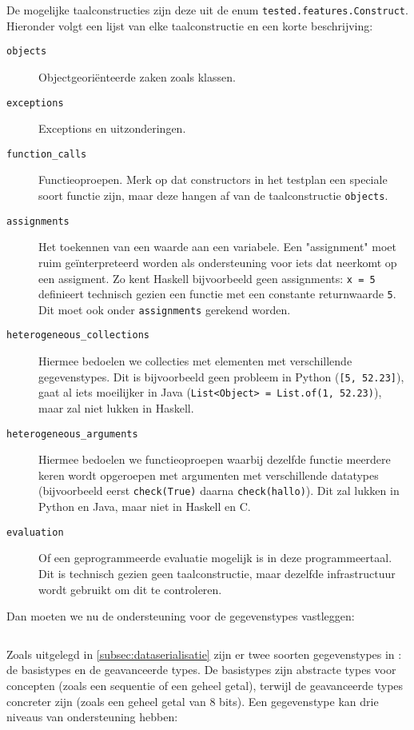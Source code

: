 De mogelijke taalconstructies zijn deze uit de enum \texttt{tested.features.Construct}.
Hieronder volgt een lijst van elke taalconstructie en een korte beschrijving:

\begin{description}
    \item[\texttt{objects}] Objectgeoriënteerde zaken zoals klassen.
    \item[\texttt{exceptions}] Exceptions en uitzonderingen.
    \item[\texttt{function\_calls}] Functieoproepen.
    Merk op dat constructors in het testplan een speciale soort functie zijn, maar deze hangen af van de taalconstructie \texttt{objects}.
    \item[\texttt{assignments}] Het toekennen van een waarde aan een variabele.
    Een "assignment" moet ruim geïnterpreteerd worden als ondersteuning voor iets dat neerkomt op een assigment.
    Zo kent Haskell bijvoorbeeld geen assignments: \texttt{x = 5} definieert technisch gezien een functie met een constante returnwaarde \texttt{5}.
    Dit moet ook onder \texttt{assignments} gerekend worden.
    \item[\texttt{heterogeneous\_collections}] Hiermee bedoelen we collecties met elementen met verschillende gegevenstypes.
    Dit is bijvoorbeeld geen probleem in Python (\texttt{[5, 52.23]}), gaat al iets moeilijker in Java (\texttt{List<Object> = List.of(1, 52.23)}), maar zal niet lukken in Haskell.
    \item[\texttt{heterogeneous\_arguments}] Hiermee bedoelen we functieoproepen waarbij dezelfde functie meerdere keren wordt opgeroepen met argumenten met verschillende datatypes (bijvoorbeeld eerst \texttt{check(True)} daarna \texttt{check(\textquotesingle{}hallo\textquotesingle{})}).
    Dit zal lukken in Python en Java, maar niet in Haskell en C\@.
    \item[\texttt{evaluation}] Of een geprogrammeerde evaluatie mogelijk is in deze programmeertaal.
    Dit is technisch gezien geen taalconstructie, maar dezelfde infrastructuur wordt gebruikt om dit te controleren.
\end{description}

Dan moeten we nu de ondersteuning voor de gegevenstypes vastleggen:

\inputminted[firstline=28,lastline=54,gobble=2]{js}{sources/c-config.json}

Zoals uitgelegd in \cref{subsec:dataserialisatie} zijn er twee soorten gegevenstypes in \tested{}: de basistypes en de geavanceerde types.
De basistypes zijn abstracte types voor concepten (zoals een sequentie of een geheel getal), terwijl de geavanceerde types concreter zijn (zoals een geheel getal van 8 bits).
Een gegevenstype kan drie niveaus van ondersteuning hebben:

